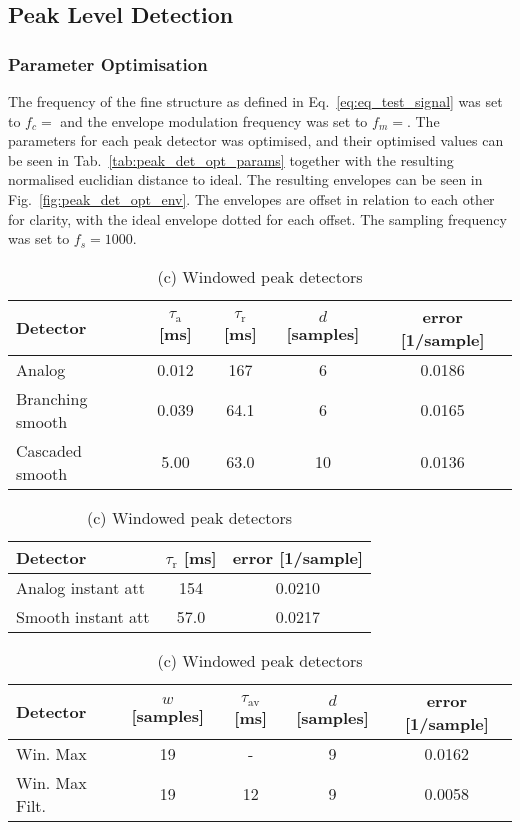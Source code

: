 \documentclass[../main2.tex]{subfiles}
\begin{document}
\subsection{Peak Level Detection}

\subsubsection{Parameter Optimisation}
The frequency of the fine structure as defined in Eq.~\eqref{eq:eq_test_signal} was set to $f_c = $ and the envelope modulation frequency was set to $f_m = $. The parameters for each peak detector was optimised, and their optimised values can be seen in Tab.~\ref{tab:peak_det_opt_params} together with the resulting normalised euclidian distance to ideal. The resulting envelopes can be seen in Fig.~\ref{fig:peak_det_opt_env}. The envelopes are offset in relation to each other for clarity, with the ideal envelope dotted for each offset. The sampling frequency was set to $f_s = 1000$.

\begin{table}[h]
\begin{center}
\caption{Optimised parameters for the various peak detectors, $f_c= $, $f_m= $}
\label{tab:peak_det_opt_params}
\caption*{(a) Attack and release peak detectors}
\begin{tabular}{| l | c c c | c |}
	\hline
	Detector 	& $\tau_\text{a}$ [ms] & $\tau_\text{r}$ [ms] & $d$ [samples] & error [1/sample]\\
	\hline
	
	Analog 			& 0.012 		& 167 	& 6		& 0.0186	\\ 
	Branching smooth 	& 0.039 		& 64.1 	& 6		& 0.0165	\\ 
	Cascaded smooth	& 5.00		& 63.0 	& 10		& 0.0136	\\
	\hline
\end{tabular}
\end{center}

\begin{center}
\caption*{(b) Instant attack peak detectors}
 \begin{tabular}{| l | c | c |}
	\hline
	Detector & $\tau_\text{r}$ [ms] & error [1/sample] \\
	\hline
	Analog instant att	& 154		& 0.0210	\\ 
	Smooth instant att	& 57.0		& 0.0217	\\ 
	\hline
\end{tabular}
\end{center}

\begin{center}
\caption*{(c) Windowed peak detectors}
\label{tab:peak_det_instatt_opt_params}
 \begin{tabular}{| l | c c c | c |}
	\hline
	Detector & $w$ [samples] & $\tau_\text{av}$ [ms] & $d$ [samples] & error [1/sample] \\
	\hline
	Win. Max		& 19		& -		& 9		& 0.0162	\\ 
	Win. Max Filt.	& 19		& 12		& 9		& 0.0058	\\
	\hline
\end{tabular}
\end{center}

\end{table}
\end{document}
